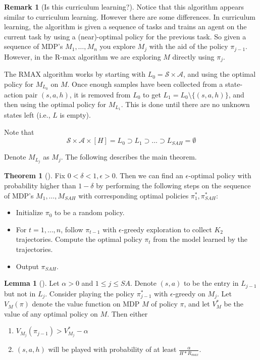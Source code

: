 \documentclass[12pt, letterpaper]{article}
\theoremstyle{definition}
\newtheorem*{thm}{Theorem}
\newtheorem*{lemma}{Lemma}
\newtheorem*{rmk}{Remark}
\theoremstyle{remark}
\begin{document}
\begin{rmk}[Is this curriculum learning?]
    Notice that this algorithm appears similar to curriculum learning. However there are some differences. In curriculum learning, the algorithm is given a sequence of tasks and trains an agent on the current task by using a (near)-optimal policy for the previous task. So given a sequence of MDP's \(M_1, \ldots, M_n\) you explore \(M_j\) with the aid of the policy \(\pi_{j-1}\). However, in the R-max algorithm we are exploring \(M\) directly using \(\pi_j\).
\end{rmk}

The RMAX algorithm works by starting with \(L_0 = \mathcal{S} \times \mathcal{A}\), and using the optimal policy for \(M_{L_0}\) on \(M\). Once enough samples have been collected from a state-action pair \((s, a, h)\), it is removed from \(L_0\) to get \(L_1 = L_0 \setminus \{(s, a, h)\}\), and then using the optimal policy for \(M_{L_1}\). This is done until there are no unknown states left (i.e., \(L\) is empty).

Note that
\[\mathcal{S} \times \mathcal{A} \times [H] = L_0 \supset L_1 \supset \ldots \supset L_{SAH} = \emptyset\]

Denote \(M_{L_j}\) as \(M_j\). The following describes the main theorem.

\begin{thm}[]
    Fix \(0 < \delta < 1, \epsilon > 0\). Then we can find an \(\epsilon\)-optimal policy with probability higher than \(1 - \delta\) by performing the following steps on the sequence of MDP's \(M_1, \ldots, M_{SAH}\) with corresponding optimal policies \(\pi^*_{1}, \pi^{*}_{SAH}\):

    \begin{itemize}
        \item Initialize \(\pi_0\) to be a random policy.
        \item For \(t = 1, \ldots, n\), follow \(\pi_{t-1}\) with \(\epsilon\)-greedy exploration to collect \(K_2\) trajectories. Compute the optimal policy \(\pi_t\) from the model learned by the trajectories.
        \item Output \(\pi_{SAH}\).
    \end{itemize}
    
\end{thm}


\begin{lemma}[]
    Let \(\alpha > 0\) and \(1 \leq j \leq SA\). Denote \((s, a)\) to be the entry in \(L_{j-1}\) but not in \(L_{j}\). Consider playing the policy \(\pi_{j-1}^*\) with \(\epsilon\)-greedy on \(M_j\). Let \(V_{M}(\pi)\) denote the value function on MDP \(M\) of policy \(\pi\), and let \(V^*_{M}\) be the value of any optimal policy on \(M\). Then either

    \begin{enumerate}
        \item \(V_{M_j} (\pi_{j-1}) > V^*_{M_j} - \alpha\)
        \item \((s, a, h)\) will be played with probability of at least \(\frac{\alpha}{H*R_{max}}\).
    \end{enumerate}
    
\end{lemma}
\end{document}
